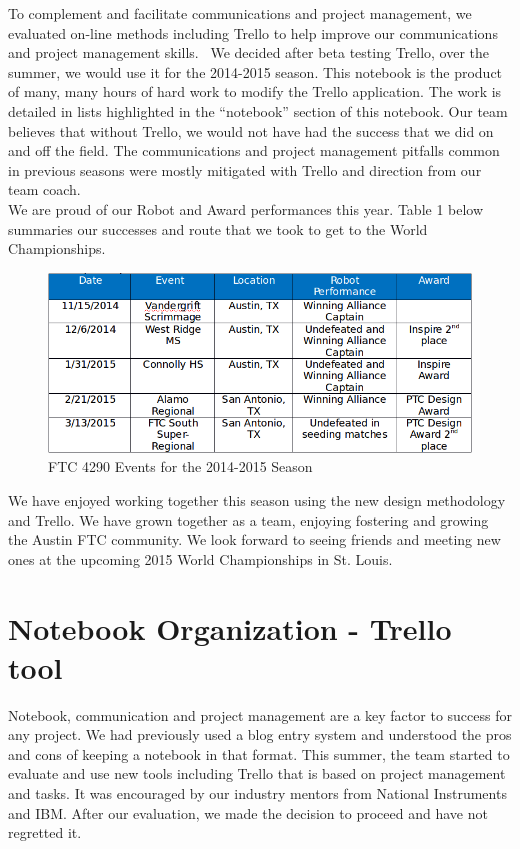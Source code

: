 To complement and facilitate communications and project management, we evaluated on-line methods including Trello to help improve our communications and project management skills.  We decided after beta testing Trello, over the summer, we would use it for the 2014-2015 season.  This notebook is the product of many, many hours of hard work to modify the Trello application.  The work is detailed in lists highlighted in the “notebook” section of this notebook.  Our team believes that without Trello, we would not have had the success that we did on and off the field.  The communications and project management pitfalls common in previous seasons were mostly mitigated with Trello and direction from our team coach.\\

We are proud of our Robot and Award performances this year. Table 1 below summaries our successes and route that we took to get to the World Championships.\\

\begin{figure}[H]
	\centering
	\includegraphics[width=\linewidth]{events}
	\caption[]{FTC 4290 Events for the 2014-2015 Season}
	\label{fig:events}
\end{figure}


We have enjoyed working together this season using the new design methodology and Trello.  We have grown together as a team, enjoying fostering and growing the Austin FTC community.  We look forward to seeing friends and meeting new ones at the upcoming 2015 World Championships in St. Louis.\\

\newpage

\section{Notebook Organization - Trello tool}
Notebook, communication and project management are a key factor to success for any project. We had previously used a blog entry system and understood the pros and cons of keeping a notebook in that format.  This summer, the team started to evaluate and use new tools including Trello that is based on project management and tasks. It was encouraged by our industry mentors from National Instruments and IBM.  After our evaluation, we made the decision to proceed and have not regretted it.\\

